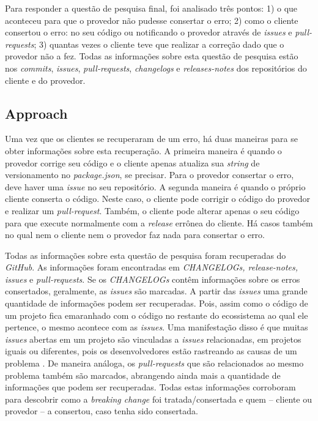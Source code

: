 Para responder a questão de pesquisa final, foi analisado três pontos: 1) o que aconteceu para que o provedor não pudesse consertar o erro; 2) como o cliente consertou o erro: no seu código ou notificando o provedor através de \textit{issues} e \textit{pull-requests}; 3) quantas vezes o cliente teve que realizar a correção dado que o provedor não a fez. Todas as informações sobre esta questão de pesquisa estão nos \textit{commits}, \textit{issues}, \textit{pull-requests}, \textit{changelogs} e \textit{releases-notes} dos repositórios do cliente e do provedor.

\subsection{Approach}
\label{apr:rq3}

Uma vez que os clientes se recuperaram de um erro, há duas maneiras para se obter informações sobre esta recuperação. A primeira maneira é quando o provedor corrige seu código e o cliente apenas atualiza sua \textit{string} de versionamento no \textit{package.json}, se precisar. Para o provedor consertar o erro, deve haver uma \textit{issue} no seu repositório. A segunda maneira é quando o próprio cliente conserta o código. Neste caso, o cliente pode corrigir o código do provedor e realizar um \textit{pull-request}. Também, o cliente pode alterar apenas o seu código para que execute normalmente com a \textit{release} errônea do cliente. Há casos também no qual nem o cliente nem o provedor faz nada para consertar o erro.

Todas as informações sobre esta questão de pesquisa foram recuperadas do \textit{GitHub}. As informações foram encontradas em \textit{CHANGELOGs, release-notes, issues} e \textit{pull-requests}. Se os \textit{CHANGELOGs} contêm informações sobre os erros consertados, geralmente, as \textit{issues} são marcadas. A partir das \textit{issues} uma grande quantidade de informações podem ser recuperadas. Pois, assim como o código de um projeto fica emaranhado com o código no restante do ecossistema ao qual ele pertence, o mesmo acontece com as \textit{issues}. Uma manifestação disso é que muitas \textit{issues} abertas em um projeto são vinculadas a \textit{issues} relacionadas, em projetos iguais ou diferentes, pois os desenvolvedores estão rastreando as causas de um problema \cite{Zhang:2018:WIL:3242887.3242891}. De maneira análoga, os \textit{pull-requests} que são relacionados ao mesmo problema também são marcados, abrangendo ainda mais a quantidade de informações que podem ser recuperadas. Todas estas informações corroboram para descobrir como a \textit{breaking change} foi tratada/consertada e quem -- cliente ou provedor -- a consertou, caso tenha sido consertada.

